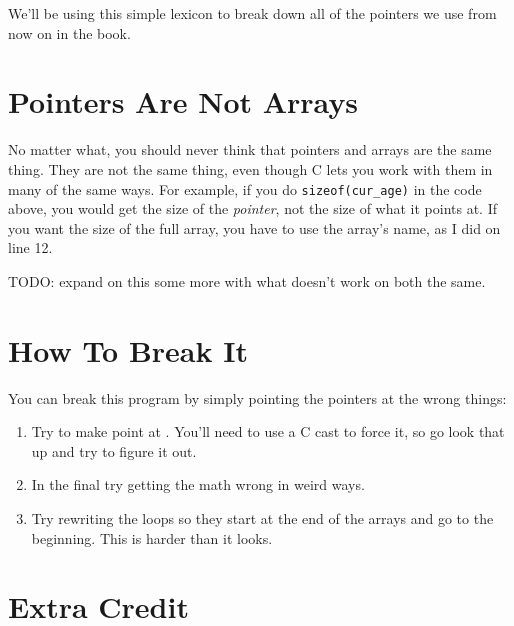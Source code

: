 We'll be using this simple lexicon to break down all of the pointers
we use from now on in the book.

\section{Pointers Are Not Arrays}

No matter what, you should never think that pointers and arrays are the same thing.
They are not the same thing, even though C lets you work with them in many of the
same ways.  For example, if you do \verb|sizeof(cur_age)| in the code above,
you would get the size of the \emph{pointer}, not the size of what it points
at.  If you want the size of the full array, you have to use the array's name, 
as I did on line 12.

TODO: expand on this some more with what doesn't work on both the same.

\section{How To Break It}

You can break this program by simply pointing the pointers at the wrong things:

\begin{enumerate}
\item Try to make  point at .  You'll need to
    use a C cast to force it, so go look that up and try to figure it out.
\item In the final  try getting the math wrong in weird ways.
\item Try rewriting the loops so they start at the end of the arrays and go
    to the beginning.  This is harder than it looks.
\end{enumerate}

\section{Extra Credit}

